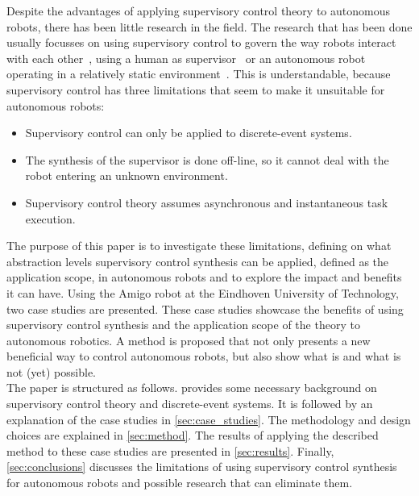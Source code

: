 Despite the advantages of applying supervisory control theory to autonomous robots, there has been little research in the field. 
The research that has been done usually focusses on using supervisory control to govern the way robots interact with each other~\cite{sup_swarm}, using a human as supervisor~\cite{sup_human} or an autonomous robot operating in a relatively static environment~\cite{sup_navigation}.
This is understandable, because supervisory control has three limitations that seem to make it unsuitable for autonomous robots:

\begin{itemize}
  \item Supervisory control can only be applied to discrete-event systems.
  \item The synthesis of the supervisor is done off-line, so it cannot deal with the robot entering an unknown environment.
  \item Supervisory control theory assumes asynchronous and instantaneous task execution.
\end{itemize}

The purpose of this paper is to investigate these limitations, defining on what abstraction levels supervisory control synthesis can be applied, defined as the application scope, in autonomous robots and to explore the impact and benefits it can have.
Using the Amigo robot at the Eindhoven University of Technology, two case studies are presented. 
These case studies showcase the benefits of using supervisory control synthesis and the application scope of the theory to autonomous robotics. 
A method is proposed that not only presents a new beneficial way to control autonomous robots, but also show what is and what is not (yet) possible.\\

The paper is structured as follows.  provides some necessary background on supervisory control theory and discrete-event systems. It is followed by an explanation of the case studies in \cref{sec:case_studies}. The methodology and design choices are explained in \cref{sec:method}.
The results of applying the described method to these case studies are presented in \cref{sec:results}.
Finally, \cref{sec:conclusions} discusses the limitations of using supervisory control synthesis for autonomous robots and possible research that can eliminate them.\\